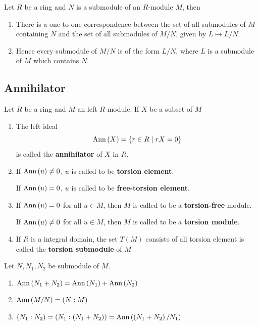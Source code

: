 \begin{theorem}
    \label{thm: The Fourth or Lattice Isomorphism Theorem of Modules}
    Let $R$ be a ring and $N$ is a submodule of an $R$-module $M$, then
    \begin{enumerate}
        \item
              There is a one-to-one correspondence between the set of all submodules of $M$ containing $N$ and the set of all submodules of $M/N$, given by $L \mapsto L / N$.
        \item
              Hence every submodule of $M / N$ is of the form $ L / N$, where $L$ is a submodule of $M$ which contains $N$.
    \end{enumerate}
\end{theorem}


\subsection{Annihilator} %
\begin{definition}
    Let $R$ be a ring and $M$ an left $R$-module. If $X$ be a subset of $M$
    \begin{enumerate}
        \item The left ideal
              \begin{equation*}
                  \operatorname{\operatorname{Ann}}\left(X\right) =\left\{ r \in R \mid rX = 0\right\}
              \end{equation*}
              is called the \textbf{annihilator} of $X$ in $R$.
        \item
              If $\operatorname{\operatorname{Ann}}\left( u \right)\neq 0$, $u$ is called to be \textbf{torsion element}.

              If $\operatorname{\operatorname{Ann}}\left( u \right)= 0$, $u$ is called to be \textbf{free-torsion element}.
        \item
              If $\operatorname{\operatorname{Ann}}\left(u\right) = 0$ for all $u\in M$, then $M$ is called to be a \textbf{torsion-free} module.

              If $\operatorname{\operatorname{Ann}}\left(u\right) \neq 0$ for all $u\in M$, then  $M$ is called to be a \textbf{torsion module}.
        \item
              If $R$ is a integral domain, the set $T(M)$ consists of all torsion element is called the \textbf{torsion submodule} of $M$
    \end{enumerate}
\end{definition}

\begin{proposition}
    Let $N,N_1,N_2$ be submodule of $M$.
    \begin{enumerate}
        \item
              $\operatorname{\operatorname{Ann}}\left( N_1+N_2 \right)=\operatorname{\operatorname{Ann}}\left( N_1 \right)+\operatorname{\operatorname{Ann}}\left( N_2 \right)$
        \item
              $\operatorname{\operatorname{Ann}}\left( M/N \right)=\left(N:M\right)$
        \item
              $\left(N_1:N_2\right)=\left(N_1:\left(N_1+N_2\right)\right)=\operatorname{\operatorname{Ann}}\left( \left(N_1+N_2\right)/N_1 \right)$
    \end{enumerate}
\end{proposition}




